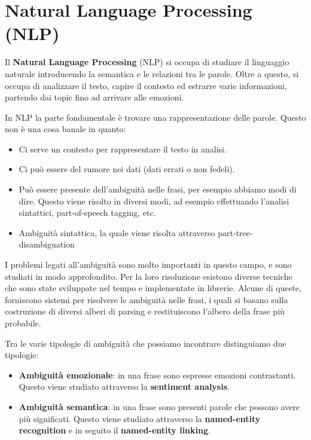 \chapter{Natural Language Processing (NLP)}
Il \textbf{Natural Language Processing} (NLP) si occupa di studiare il linguaggio
naturale introducendo la semantica e le relazioni tra le parole. Oltre a questo,
si occupa di analizzare il testo, capire il contesto ed estrarre varie informazioni,
partendo dai topic fino ad arrivare alle emozioni.

In NLP la parte fondamentale è trovare una rappresentazione delle parole. Questo
non è una cosa banale in quanto:
\begin{itemize}
      \item Ci serve un contesto per rappresentare il testo in analisi.
      \item Ci può essere del rumore nei dati (dati errati o non fedeli).
      \item Può essere presente dell'ambiguità nelle frasi, per esempio abbiamo
            modi di dire. Questo viene risolto in diversi modi, ad esempio
            effettuando l'analisi sintattici, part-of-speech tagging, etc.
      \item Ambiguità sintattica, la quale viene risolta attraverso part-tree-disambiguation
\end{itemize}
I problemi legati all'ambiguità sono molto importanti in questo campo, e sono
studiati in modo approfondito. Per la loro risoluzione esistono diverse tecniche
che sono state sviluppate nel tempo e implementate in librerie.
Alcune di queste, forniscono sistemi per risolvere le ambiguità nelle frasi, i
quali si basano sulla costruzione di diversi alberi di parsing e restituiscono
l'albero della frase più probabile.

Tra le varie tipologie di ambiguità che possiamo incontrare distinguiamo due
tipologie:
\begin{itemize}
      \item \textbf{Ambiguità emozionale}: in una frase sono espresse emozioni
            contrastanti. Questo viene studiato attraverso la \textbf{sentiment analysis}.
      \item \textbf{Ambiguità semantica}: in una frase sono presenti parole che
            possono avere più significati. Questo viene studiato attraverso la
            \textbf{named-entity recognition} e in seguito il \textbf{named-entity
                  linking}.
\end{itemize}
